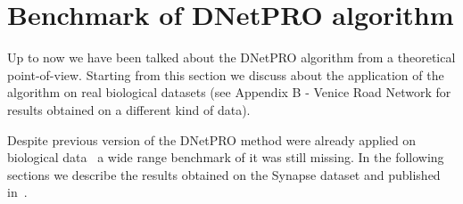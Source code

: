 \documentclass{standalone}
\begin{document}
\section[Benchmark]{Benchmark of DNetPRO algorithm}\label{benchmark}

Up to now we have been talked about the DNetPRO algorithm from a theoretical point-of-view.
Starting from this section we discuss about the application of the algorithm on real biological datasets (see Appendix B - Venice Road Network for results obtained on a different kind of data).

Despite previous version of the DNetPRO method were already applied on biological data~\cite{PMrna, Scotlandi2009, PMgene, Terragna} a wide range benchmark of it was still missing.
In the following sections we describe the results obtained on the Synapse dataset and published in~\cite{Curti2019}.
\end{document}
